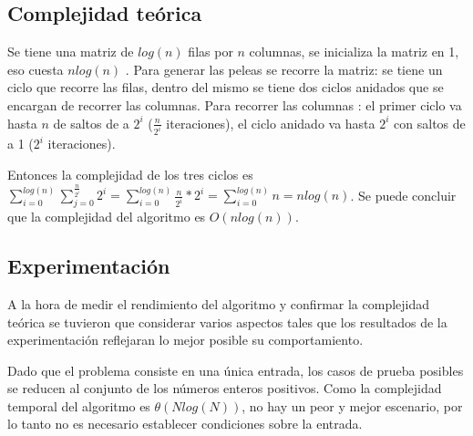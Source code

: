         

    \subsection{Complejidad teórica}
         
      Se tiene una matriz de $log(n)$ filas por $n$ columnas, se inicializa la matriz en 1, eso cuesta $nlog(n)$ . Para generar las peleas se recorre la matriz: se tiene un ciclo que recorre las filas, dentro del mismo se tiene dos ciclos anidados que se encargan de recorrer las columnas. Para recorrer las columnas : el primer ciclo va hasta $n$ de saltos de a $2^i$ ($\frac{n}{2^i}$ iteraciones), el ciclo anidado va hasta $2^i$ con saltos de a 1 ($2^i$ iteraciones).

      Entonces la complejidad de los tres ciclos es $\sum_{i = 0}^{log(n)} \sum_{j = 0}^{\frac{n}{2^i}}  2^i = \sum_{i = 0}^{log(n)} \frac{n}{2^i} * 2^i = \sum_{i = 0}^{log(n)} n = nlog(n)$. Se puede concluir que la complejidad del algoritmo es $O(nlog(n))$. 




    \subsection{Experimentación}

	A la hora de medir el rendimiento del algoritmo y confirmar la complejidad
	teórica se tuvieron que considerar varios aspectos tales que los
	resultados de la experimentación reflejaran lo mejor posible su
	comportamiento.

	Dado que el problema consiste en una única entrada, los casos de prueba
	posibles se reducen al conjunto de los números enteros positivos. Como la
	complejidad temporal del algoritmo es $\theta(Nlog(N))$, no hay un peor
	y mejor escenario, por lo tanto no es necesario establecer condiciones sobre
	la entrada.

